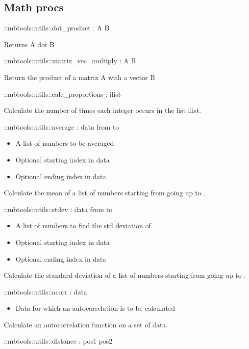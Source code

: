 \subsection{Math procs}

\begin{code}    
  ::mbtools::utils::dot_product  :  A B
\end{code}
Returns A dot B
\begin{code}    
  ::mbtools::utils::matrix_vec_multiply : A B
\end{code}
Return the product of a matrix A with a vector B
\begin{code}    
  ::mbtools::utils::calc_proportions : ilist
\end{code}
Calculate the number of times each integer occurs in the list ilist.
\begin{code}    
  ::mbtools::utils::average : data from to
\end{code}
\begin{itemize}
          \item {} A list of numbers to be averaged
          \item {} Optional starting index in data
          \item {} Optional ending index in data
\end{itemize}
Calculate the mean of a list of numbers starting from  going up to .
\begin{code}    
  ::mbtools::utils::stdev : data from to
\end{code}
\begin{itemize}
          \item {} A list of numbers to find the std deviation of
          \item {} Optional starting index in data
          \item {} Optional ending index in data
\end{itemize}
Calculate the standard deviation of a list of numbers starting from  going up to .
\begin{code}    
  ::mbtools::utils::acorr : data
\end{code}
\begin{itemize}
          \item {} Data for which an autocorrelation is to be calculated
\end{itemize}
Calculate an autocorrelation function on a set of data.
\begin{code}    
  ::mbtools::utils::distance : pos1 pos2
\end{code}
